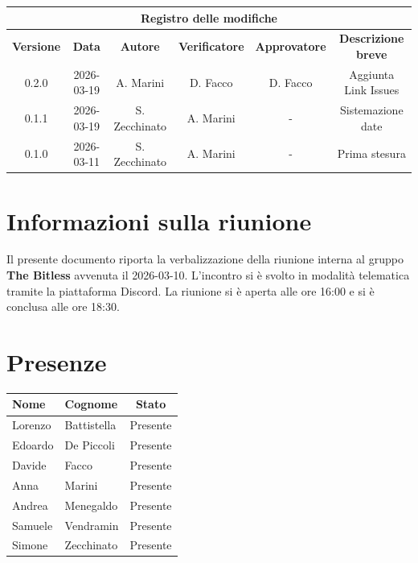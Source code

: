 \documentclass[a4paper, 10pt, colorlinks=true, linkcolor=black, urlcolor=blue, citecolor=blue, hidelinks]{article}
\begin{document}
\newcommand{\tipoverbale}{interno}
\newcommand{\dataverbale}{2026-03-10}
\newcommand{\dataversione}{2026-03-19}
\newcommand{\versione}{0.2.0}
\newcommand{\stato}{Approvazione}
\newcommand{\destinatari}{The Bitless, prof. Tullio Vardanega, prof. Riccardo Cardin}

\begin{titlepage}

\end{titlepage}

\newpage
{}

\begin{center}
    \begin{tabular}{|c|c|c|c|c|c|}
        \hline
        \multicolumn{6}{|c|}{\textbf{Registro delle modifiche}} \\
        \hline
        \textbf{Versione} & \textbf{Data} & \textbf{Autore} & \textbf{Verificatore} & \textbf{Approvatore} & \textbf{Descrizione breve} \\
        \hline
        0.2.0 & 2026-03-19 & A. Marini & D. Facco & D. Facco &  Aggiunta Link Issues \\
        \hline
        0.1.1 & \dataversione & S. Zecchinato & A. Marini & - & Sistemazione date \\
        \hline 
        0.1.0 & 2026-03-11 & S. Zecchinato & A. Marini & - & Prima stesura \\
        \hline
    \end{tabular}
\end{center}

\newpage
\tableofcontents 

\newpage
\section{Informazioni sulla riunione}
Il presente documento riporta la verbalizzazione della riunione interna al gruppo \textbf{The Bitless} avvenuta il \dataverbale{}. L'incontro si è svolto in modalità telematica tramite la piattaforma Discord. La riunione si è aperta alle ore 16:00 e si è conclusa alle ore 18:30.

\section{Presenze}
\begin{center}
\begin{tabular}{|l|l|c|}
\hline
\textbf{Nome} & \textbf{Cognome} & \textbf{Stato} \\
\hline
Lorenzo & Battistella & Presente \\
Edoardo & De Piccoli & Presente \\
Davide & Facco & Presente \\
Anna & Marini & Presente \\
Andrea & Menegaldo & Presente \\
Samuele & Vendramin & Presente \\
Simone & Zecchinato & Presente \\
\hline
\end{tabular}
\end{center}
\end{document}
